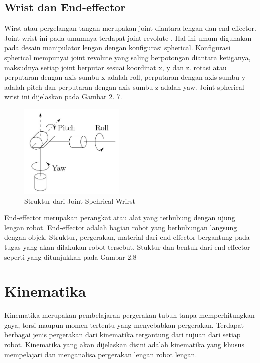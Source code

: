 \subsection{ Wrist dan End-effector }

Wirst atau pergelangan tangan merupakan joint diantara lengan dan end-effector. Joint wrist ini pada umumnya terdapat joint revolute . Hal ini umum digunakan pada desain manipulator lengan dengan konfigurasi spherical. Konfigurasi spherical mempunyai joint revolute yang saling berpotongan diantara ketiganya, maksudnya setiap joint berputar sesuai koordinat x, y dan z. rotasi atau perputaran dengan axis sumbu x adalah roll, perputaran dengan axis sumbu y adalah pitch dan perputaran dengan axis sumbu z adalah yaw. Joint spherical wrist ini dijelaskan pada Gambar 2. 7.
	\begin{figure}[H]
	\centering
	\includegraphics[width=5cm]{gambar/wirst.jpg}
	\caption{Struktur dari Joint Spehrical Wrirst}
\end{figure}


End-effector merupakan perangkat atau alat yang terhubung dengan ujung lengan robot. End-effector adalah bagian robot yang berhubungan langsung dengan objek. Struktur, pergerakan, material dari end-effector bergantung pada tugas yang akan dilakukan robot tersebut. Stuktur dan bentuk dari end-effector seperti yang ditunjukkan pada Gambar 2.8


\section{Kinematika}
Kinematika merupakan pembelajaran pergerakan tubuh tanpa memperhitungkan gaya, torsi maupun momen tertentu yang menyebabkan pergerakan. Terdapat berbagai jenis pergerakan dari kinematika tergantung dari tujuan dari setiap robot. Kinematika yang akan dijelaskan disini adalah kinematika yang khusus mempelajari dan menganalisa pergerakan lengan robot lengan.  

